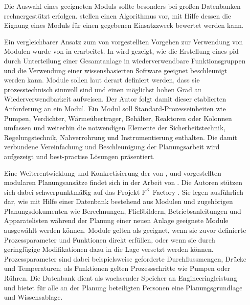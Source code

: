 Die Auswahl eines geeigneten Moduls sollte besonders bei gro\ss{}en Datenbanken rechnergest\"utzt erfolgen. \citeauthor{Obst_2013} stellen einen Algorithmus vor, mit Hilfe dessen die Eignung eines Moduls f\"ur einen gegebenen Einsatzzweck bewertet werden kann. \cite{Obst_2013}

Ein vergleichbarer Ansatz zum von \citeauthor{Hady_2012} vorgestellten Vorgehen zur Verwendung von Modulen wurde von \citeauthor{Uzuner_2013} in \cite{Uzuner_2012, Uzuner_2013} erarbeitet. In  wird gezeigt, wie die Erstellung eines \ac{pid} durch Unterteilung einer Gesamtanlage in wiederverwendbare Funktionsgruppen und die Verwendung einer wissensbasierten Software geeignet beschleunigt werden kann. Module sollen laut \citeauthor{Uzuner_2013} derart definiert werden, dass sie prozesstechnisch sinnvoll sind und einen m\"oglichst hohen Grad an Wiederverwendbarkeit aufweisen. Der Autor folgt damit dieser etablierten Anforderung an ein Modul. Ein Modul soll Standard-Prozesseinheiten wie Pumpen, Verdichter, W\"arme\"ubertrager, Beh\"alter, Reaktoren oder Kolonnen umfassen und weiterhin die notwendigen Elemente der Sicherheitstechnik, Regelungstechnik, Nahverrohrung und Instrumentierung enthalten. Die damit verbundene Vereinfachung und Beschleunigung der Planungsarbeit wird aufgezeigt und best-practise L\"osungen pr\"asentiert.

Eine Weiterentwicklung und Konkretisierung der von \citeauthor{Bramsiepe_2012}, \citeauthor{Uzuner_2012} und \citeauthor{Hady_2012} \cite{Bramsiepe_2012, Uzuner_2012, Hady_2012} vorgestellten modularen Planungsans\"atze findet sich in der Arbeit  von \citeauthor{Fleischer_2016} \cite{Fleischer_2016}. Die Autoren st\"utzen sich dabei schwerpunktm\"a\ss{}ig auf das Projekt $\text{F}^{3}$--Factory \cite{f3_2014}. Sie legen ausf\"uhrlich dar, wie mit Hilfe einer Datenbank bestehend aus Modulen und zugeh\"origen Planungsdokumenten wie Berechnungen, Flie\ss{}bildern, Betriebsanleitungen und Apparatelisten w\"ahrend der Planung einer neuen Anlage geeignete Module ausgew\"ahlt werden k\"onnen. Module gelten als geeignet, wenn sie zuvor definierte Prozessparameter und Funktionen direkt erf\"ullen, oder wenn sie durch geringf\"ugige Modifikationen dazu in die Lage versetzt werden k\"onnen. Prozessparameter sind dabei beispielsweise geforderte Durchflussmengen, Dr\"ucke und Temperaturen; als Funktionen gelten Prozessschritte wie Pumpen oder R\"uhren. Die Datenbank dient als wachsender Speicher an Engineeringleistung und bietet f\"ur alle an der Planung beteiligten Personen eine Planungsgrundlage und Wissensablage. 

